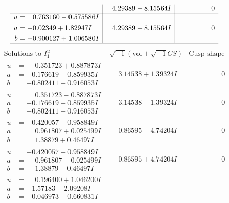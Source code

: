\documentclass[1p]{elsarticle_modified}
\theoremstyle{definition}
\newcommand{\I}{\sqrt{-1}}
\begin{document}
$$\begin{array}{c|c|c}
 & \phantom{-}4.29389 - 8.15564 I & \phantom{-0.000000 } 0 \\ \hline\begin{aligned}
u &= \phantom{-}0.763160 - 0.575586 I \\
a &= -0.02349 + 1.82947 I \\
b &= -0.900127 + 1.006580 I\end{aligned}
 & \phantom{-}4.29389 + 8.15564 I & \phantom{-0.000000 } 0\\
 \hline 
 \end{array}$$\newpage$$\begin{array}{c|c|c}  
\text{Solutions to }I^u_{1}& \I (\text{vol} + \sqrt{-1}CS) & \text{Cusp shape}\\
 \hline 
\begin{aligned}
u &= \phantom{-}0.351723 + 0.887873 I \\
a &= -0.176619 + 0.859935 I \\
b &= -0.802411 + 0.916053 I\end{aligned}
 & \phantom{-}3.14538 + 1.39324 I & \phantom{-0.000000 } 0 \\ \hline\begin{aligned}
u &= \phantom{-}0.351723 - 0.887873 I \\
a &= -0.176619 - 0.859935 I \\
b &= -0.802411 - 0.916053 I\end{aligned}
 & \phantom{-}3.14538 - 1.39324 I & \phantom{-0.000000 } 0 \\ \hline\begin{aligned}
u &= -0.420057 + 0.958849 I \\
a &= \phantom{-}0.961807 + 0.025499 I \\
b &= \phantom{-}1.38879 + 0.46497 I\end{aligned}
 & \phantom{-}0.86595 - 4.74204 I & \phantom{-0.000000 } 0 \\ \hline\begin{aligned}
u &= -0.420057 - 0.958849 I \\
a &= \phantom{-}0.961807 - 0.025499 I \\
b &= \phantom{-}1.38879 - 0.46497 I\end{aligned}
 & \phantom{-}0.86595 + 4.74204 I & \phantom{-0.000000 } 0 \\ \hline\begin{aligned}
u &= \phantom{-}0.196400 + 1.046200 I \\
a &= -1.57183 - 2.09208 I \\
b &= -0.046973 - 0.660831 I\end{aligned}

\end{array}$$
\end{document}
